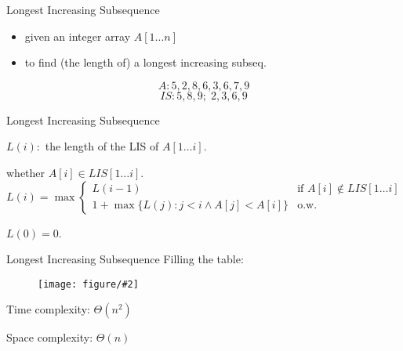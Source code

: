 \documentclass{beamer}
\newcommand{\fig}[2]
{
  \begin{figure}[htp]
	  \centering
	  \texttt{[image: figure/\#2]}
  \end{figure}
}
\begin{document}
\begin{frame}{Longest Increasing Subsequence}
  \begin{problem}
    \begin{itemize}
      \item given an integer array $A[1 \ldots n]$
      \item to find (the length of) a longest increasing subseq.
    \end{itemize}
    
    \vspace{0.50cm}
    \begin{mdframed}[leftmargin = 2.5cm, rightmargin = 2.5cm]
      \[ A: 5,2,8,6,3,6,7,9 \]
      \[ IS: 5,8,9; \; 2, 3, 6, 9 \]
    \end{mdframed}
  \end{problem}
\end{frame}
\begin{frame}{Longest Increasing Subsequence}

  \begin{mdframed}[rightmargin = 3.0cm]
    $L(i):$ the length of the LIS of $A[1 \ldots i]$.
  \end{mdframed}
  
  \vspace{0.50cm}
  \begin{theorem}[Recurrence]
     whether $A[i] \in LIS[1 \ldots i]$.
    \begin{displaymath}
      L(i) = \max \left\{
        \begin{array}{ll}
          L(i - 1) & \textrm{if } A[i] \notin LIS[1 \ldots i]  \\
          1 + \max \{ L(j): j < i \land A[j] < A[i] \} & \textrm{o.w.}    
        \end{array}
      \right.
    \end{displaymath}
  \end{theorem}
  \vspace{0.50cm}
   $L(0) = 0$.
\end{frame}
\begin{frame}{Longest Increasing Subsequence}
  Filling the table:
  \fig{width = 0.70\textwidth}{LISorder}
  
  \vspace{0.50cm}
  Time complexity: $\Theta(n^2)$
  
  Space complexity: $\Theta(n)$
\end{frame}
\end{document}
